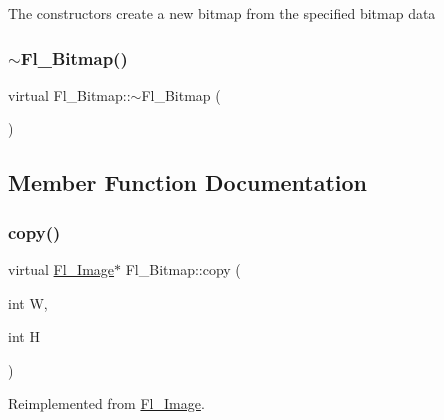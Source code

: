 The constructors create a new bitmap from the specified bitmap data \mbox{\label{class_fl___bitmap_ae94d70a06db6f307388a140ec621606d}} 
\subsubsection{\texorpdfstring{$\sim$\+Fl\+\_\+\+Bitmap()}{~Fl\_Bitmap()}}
{\footnotesize\ttfamily virtual Fl\+\_\+\+Bitmap\+::$\sim$\+Fl\+\_\+\+Bitmap (\begin{DoxyParamCaption}{ }\end{DoxyParamCaption})\hspace{0.3cm}{\ttfamily [virtual]}}



\subsection{Member Function Documentation}
\mbox{\label{class_fl___bitmap_af8d08b1153115fc223215251878c8005}} 
\subsubsection{\texorpdfstring{copy()}{copy()}\hspace{0.1cm}{\footnotesize\ttfamily [1/2]}}
{\footnotesize\ttfamily virtual \hyperlink{class_fl___image}{Fl\+\_\+\+Image}$\ast$ Fl\+\_\+\+Bitmap\+::copy (\begin{DoxyParamCaption}\item[{int}]{W,  }\item[{int}]{H }\end{DoxyParamCaption})\hspace{0.3cm}{\ttfamily [virtual]}}



Reimplemented from \hyperlink{class_fl___image_a8c830df178375a758ce8a3fa2e15359d}{Fl\+\_\+\+Image}.

\mbox{\label{class_fl___bitmap_a50bad9f31e02c3c71c90622ca1f234bf}} 

